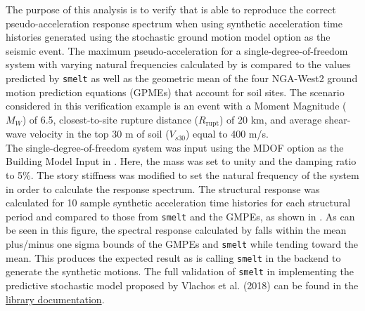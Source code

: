 The purpose of this analysis is to verify that \texttt{\getsoftwarename{}} is able
to reproduce the correct pseudo-acceleration response spectrum when
using synthetic acceleration time histories generated using the
stochastic ground motion model option as the seismic event. The maximum
pseudo-acceleration for a single-degree-of-freedom system with varying
natural frequencies calculated by \texttt{\getsoftwarename{}} is compared to the
values predicted by \texttt{smelt} as well as the geometric mean
of the four NGA-West2 ground motion prediction equations (GPMEs)
that account for soil sites. The scenario considered in this verification
example is an event with a Moment Magnitude ($M_W$) of 6.5, closest-to-site
rupture distance ($R_{\textrm{rupt}}$) of 20 km, and average shear-wave velocity in the top
30 m of soil ($V_{s30}$) equal to 400 m/s.\\

The single-degree-of-freedom system was input using the MDOF option as
the Building Model Input in \texttt{\getsoftwarename{}}. Here, the mass was set to
unity and the damping ratio to 5\%. The story stiffness was modified
to set the natural frequency of the system in order to calculate the
response spectrum. The structural response was calculated for 10
sample synthetic acceleration time histories for each structural
period and compared to those from \texttt{smelt} and the GMPEs, as
shown in . As can be seen in this
figure, the spectral response calculated by \texttt{\getsoftwarename{}} falls
within the mean plus/minus one sigma bounds of the GMPEs and
\texttt{smelt} while tending toward the mean. This produces the
expected result as \texttt{\getsoftwarename{}} is calling \texttt{smelt} in the
backend to generate the synthetic motions. The full validation of
\texttt{smelt} in implementing the predictive stochastic model
proposed by Vlachos et al. (2018) \cite{vlachos2018predictive} can be
found in the
\href{https://github.com/NHERI-SimCenter/smelt}{library
  documentation}.


